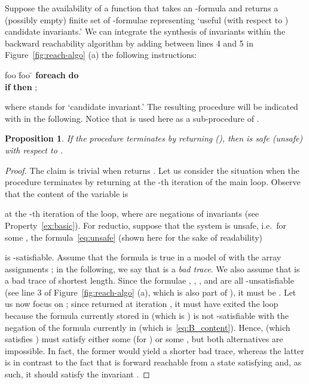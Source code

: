\documentclass{LMCS}
\theoremstyle{plain}\newtheorem{assumption}[thm]{Assumption}
\theoremstyle{plain}\newtheorem{proposition}[thm]{Proposition}
\theoremstyle{plain}\newtheorem{property}[thm]{Property}
\theoremstyle{plain}\newtheorem{example}[thm]{Example}
\theoremstyle{plain}\newtheorem{claim}[thm]{Claim}
\theoremstyle{plain}\newtheorem{lemma}[thm]{Lemma}
\begin{document}
Suppose the availability of a function  that takes an
-formula  and returns a (possibly empty) finite set 
of -formulae representing `useful (with respect to )
candidate invariants.'  We can integrate the synthesis of invariants
within the backward reachability algorithm by adding between lines 4
and 5 in Figure~\ref{fig:reach-algo} (a) the following instructions:
\begin{center}
\begin{minipage}{.7\textwidth}
\begin{tabbing}
  foo \= foo \= \> \> \textbf{foreach} 
            \textbf{do} \\
  \> \> \hspace{.25cm} \textbf{if} 
           \textbf{then} ;
\end{tabbing}
\end{minipage}
\end{center}
where  stands for `candidate invariant.'  The resulting
procedure will be indicated with  in the
following.  Notice that  is used here as a
sub-procedure of .
\begin{proposition}
  \label{prop:soundness}
If the procedure
   terminates by returning 
  (), then  is safe (unsafe) with respect to
  .
\end{proposition}
\begin{proof}
The claim is trivial when  returns
  .  Let us consider the situation when the procedure
  terminates by returning  at the -th iteration
  of the main loop.  Observe that the content of the variable  is
  
  at the -th iteration of the loop, where  are
  negations of invariants (see Property~\ref{ex:basic}). For reductio,
  suppose that the system is unsafe, i.e.\ for some , the
  formula~\eqref{eq:unsafe} (shown here for the sake of readability)
  
  is -satisfiable.  Assume that the formula is true in a model
  of  with the array assignments ; in the
  following, we say that  is a \emph{bad trace}.  We
  also assume that  is a bad trace of shortest
  length.  Since the formulae , , , and  are all
  -unsatisfiable (see line 3 of Figure~\ref{fig:reach-algo}
  (a), which is also part of ), it must be
  .  Let us now focus on ; since
   returned  at iteration
  , it must have exited the loop because the formula currently
  stored in  (which is ) is not
  -satisfiable with the negation of the formula currently in
   (which is~\eqref{eq:B_content}). Hence,  (which
  satisfies ) must satisfy either some 
  (for ) or some , but both alternatives are
  impossible. In fact, the former would yield a shorter bad trace,
  whereas the latter is in contrast to the fact that  is
  forward reachable from a state satisfying  and, as such, it
  should satisfy the invariant .
\end{proof}
\end{document}
